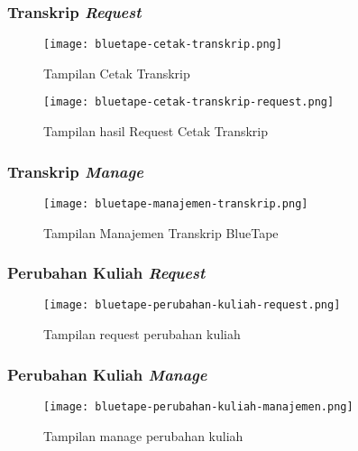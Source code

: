 \subsubsection{Transkrip \textit{Request}}
\begin{figure}[H]
	\centering  
	\texttt{[image: bluetape-cetak-transkrip.png]}  
	\caption[Tampilan Cetak Transkrip]{Tampilan Cetak Transkrip} 
	\label{fig:bluetape-cetak-transkrip} 
\end{figure}

\begin{figure}[H]
	\centering  
	\texttt{[image: bluetape-cetak-transkrip-request.png]}  
	\caption[Tampilan hasil Request Cetak Transkrip]{Tampilan hasil Request Cetak Transkrip} 
	\label{fig:bluetape-cetak-transkrip-request} 
\end{figure}

\subsubsection{Transkrip \textit{Manage}}
\begin{figure}[H]
	\centering  
	\texttt{[image: bluetape-manajemen-transkrip.png]}  
	\caption[Tampilan Manajemen Transkrip BlueTape]{Tampilan Manajemen Transkrip BlueTape} 
	\label{fig:bluetape-manajemen-transkrip} 
\end{figure}

\subsubsection{Perubahan Kuliah \textit{Request}}
\begin{figure}[H]
	\centering  
	\texttt{[image: bluetape-perubahan-kuliah-request.png]}  
	\caption[Tampilan request perubahan kuliah]{Tampilan request perubahan kuliah} 
	\label{fig:bluetape-perubahan-kuliah-request} 
\end{figure}

\subsubsection{Perubahan Kuliah \textit{Manage}}
\begin{figure}[H]
	\centering  
	\texttt{[image: bluetape-perubahan-kuliah-manajemen.png]}  
	\caption[Tampilan manage perubahan kuliah]{Tampilan manage perubahan kuliah} 
	\label{fig:bluetape-perubahan-kuliah-manajemen} 
\end{figure}

